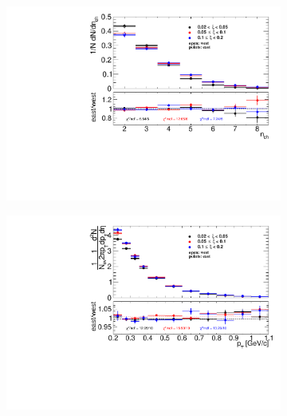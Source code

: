 \begin{figure}[h!]
	\centering
	\begin{subfigure}{.49\textwidth}
		\includegraphics[width=\textwidth,page=1]{chapters/chrgSTAR/img/eastWest/nch_test.pdf}
	\end{subfigure}
	\begin{subfigure}{.49\textwidth}
		\includegraphics[width=\textwidth,page=1]{chapters/chrgSTAR/img/eastWest/pt_test.pdf}
	\end{subfigure}
	\begin{subfigure}{.49\textwidth}

\end{subfigure}
\end{figure}
